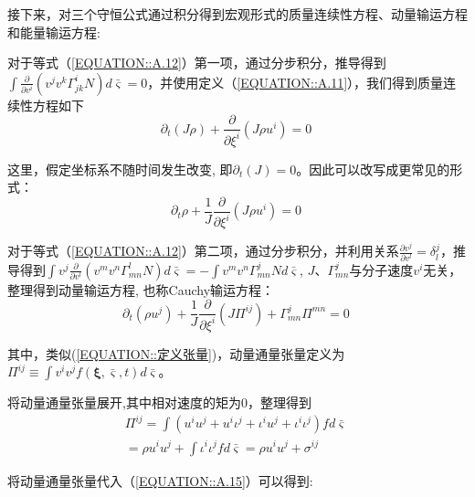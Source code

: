 \documentclass[MathematicsNumericsDerivationsAndOpenFOAM.tex]{subfiles}
\begin{document}
接下来，对三个守恒公式通过积分得到宏观形式的质量连续性方程、动量输运方程和能量输运方程:


对于等式（\ref{EQUATION::A.12}）第一项，通过分步积分，推导得到$\int\frac{\partial}{\partial v^{i}}\left( v^{j} v^{k} \Gamma_{j k}^{i} N\right)d \bar{\varsigma}=0$，并使用定义（\ref{EQUATION::A.11}），我们得到质量连续性方程如下
%
%
\begin{equation}
  \partial_{t}(J \rho)+\frac{\partial}{\partial \xi^{i}}\left(J \rho u^{i}\right)=0
  \label{EQUATION::A.13} ~
\end{equation}
%
%

这里，假定坐标系不随时间发生改变, 即$\partial_{t}(J)=0$。因此可以改写成更常见的形式：
%
%
\begin{equation}
  \boxed{
    \partial_{t} \rho+\frac{1}{J} \frac{\partial}{\partial \xi^{i}}\left(J \rho u^{i}\right)=0
  }
  \label{EQUATION::A.14} ~
\end{equation}
%
%

%
%

对于等式（\ref{EQUATION::A.12}）第二项，通过分步积分，并利用关系$\frac{\partial v^{j}}{\partial v^{l}}=\delta_{l}^{j}$，推导得到$\int v^{j}\frac{\partial}{\partial v^{l}}\left(v^{m} v^{n} \Gamma_{mn}^{l} N\right)d\bar{\varsigma}=-\int v^{m} v^{n} \Gamma_{mn}^{j} N d\bar{\varsigma}$, $J$、$\Gamma_{mn}^j$与分子速度$v^i$无关，整理得到动量输运方程, 也称Cauchy输运方程：
%
%
\begin{equation}
  \boxed{
    \partial_{t}\left(\rho u^{j}\right)+\frac{1}{J} \frac{\partial}{\partial \xi^{i}}\left(J \Pi^{i j}\right)+\Gamma_{m n}^{j} \Pi^{m n}=0
  }
  \label{EQUATION::A.15} ~
\end{equation}
%
%

其中，类似(\ref{EQUATION::定义张量})，动量通量张量定义为$\Pi^{ij} \equiv \int  v^{i} v^{j} f(\boldsymbol{\xi}, \bar{\varsigma}, t)d \bar{\varsigma}$。

将动量通量张量展开,其中相对速度的矩为0，整理得到
\begin{equation}
  \begin{aligned}
    \Pi^{i j}=\int   \left(u^{i} u^{j}+u^{i} \iota^{j}+\iota^{i} u^{j}+\iota^{i} \iota^{j}\right) f  d \bar{\varsigma} \\
    =\rho u^{i} u^{j}+\int \iota^{i} \iota^{j} f  d \bar{\varsigma} = \rho u^{i} u^{j}+ \sigma^{i j}
  \end{aligned}
  \label{EQUATION::动量通量推导} ~
\end{equation}

将动量通量张量代入（\ref{EQUATION::A.15}）可以得到:
\end{document}
